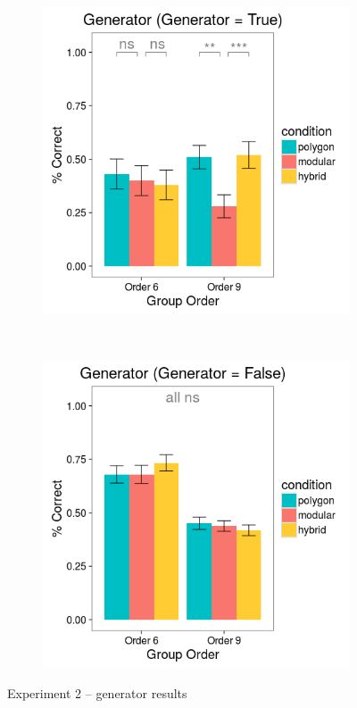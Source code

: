 \documentclass[man,10pt]{apa6}
\begin{document}
\begin{figure}[H]
\centering
\begin{subfigure}[c]{0.3\textwidth}
\centering
\includegraphics[width=\textwidth]{figures/2/gen_T_r.png}
\end{subfigure}
~
\begin{subfigure}[c]{0.3\textwidth}
\centering
\includegraphics[width=\textwidth]{figures/2/gen_F_r.png}
\end{subfigure}
\caption{Experiment 2 -- generator results}
\label{ex2_gen}
\end{figure}\noindent 
\end{document}
